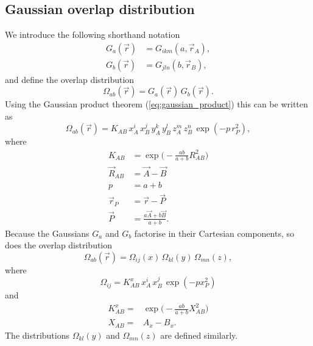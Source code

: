 \subsection{Gaussian overlap distribution}
We introduce the following shorthand notation
\begin{align}
  G_a(\vec r) & = G_{ikm}(a, \vec r_A), \label{eq:Ga}\\
  G_b(\vec r) & = G_{jln}(b, \vec r_B), \label{eq:Gb}
\end{align}
and define the overlap distribution
\begin{equation}
 \Omega_{ab}(\vec r) = G_a(\vec r)\,G_b(\vec r).
\end{equation}
Using the Gaussian product theorem (\ref{eq:gaussian_product}) this can be written as
\begin{equation}
 \Omega_{ab}(\vec r) = K_{AB}\,x^i_A\,x^j_B\,y^k_A\,y^l_B\,z^m_A\,z^n_B\,\exp(-p\,r^2_P),
\end{equation}
where
\begin{equation}
\label{eq:gaussian_product_defs}
 \begin{split}
  K_{AB} & = \exp\Big(-\frac{ab}{a + b}R^2_{AB}\Big) \\
  \vec R_{AB} & =  \vec A - \vec B \\
  p & = a + b\\
  \vec r_P & = \vec r - \vec P \\
  \vec P & = \frac{a\vec A + b\vec B}{a + b}.
 \end{split}
\end{equation}
Because the Gaussians $G_a$ and $G_b$ factorise in their Cartesian components, so does the overlap distribution
\begin{equation}
 \Omega_{ab}(\vec r) = \Omega_{ij}(x)\,\Omega_{kl}(y)\,\Omega_{mn}(z),
\end{equation}
where
\begin{equation}
 \Omega_{ij} = K^x_{AB}\,x^i_A\,x^j_B\,\exp(-px^2_P)
\end{equation}
and
\begin{equation}
\begin{split}
 K^x_{AB} = & \exp\Big(-\frac{ab}{a + b}X^2_{AB}\Big) \\
   X_{AB} = & A_x - B_x.
\end{split}
\end{equation}
The distributions $\Omega_{kl}(y)$ and $\Omega_{mn}(z)$ are defined similarly.




